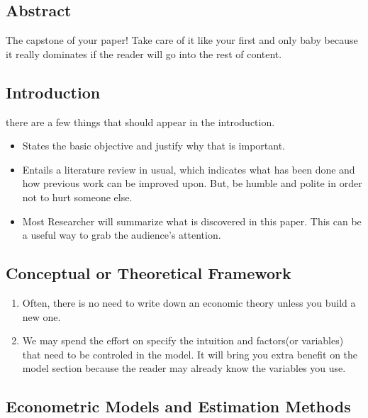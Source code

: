 \documentclass[]{book}
\begin{document}
\hypertarget{abstract}{%
\subsection{Abstract}\label{abstract}}

The capstone of your paper! Take care of it like your first and only baby because it really dominates if the reader will go into the rest of content.

\hypertarget{introduction}{%
\subsection{Introduction}\label{introduction}}

there are a few things that should appear in the introduction.

\begin{itemize}
\item
  States the basic objective and justify why that is important.
\item
  Entails a literature review in usual, which indicates what has been done and how previous work can be improved upon. But, be humble and polite in order not to hurt someone else.
\item
  Most Researcher will summarize what is discovered in this paper. This can be a useful way to grab the audience's attention.
\end{itemize}

\hypertarget{conceptual-or-theoretical-framework}{%
\subsection{Conceptual or Theoretical Framework}\label{conceptual-or-theoretical-framework}}

\begin{enumerate}
\def\labelenumi{\arabic{enumi}.}
\item
  Often, there is no need to write down an economic theory unless you build a new one.
\item
  We may spend the effort on specify the intuition and factors(or variables) that need to be controled in the model. It will bring you extra benefit on the model section because the reader may already know the variables you use.
\end{enumerate}

\hypertarget{econometric-models-and-estimation-methods}{%
\subsection{Econometric Models and Estimation Methods}\label{econometric-models-and-estimation-methods}}
\end{document}

